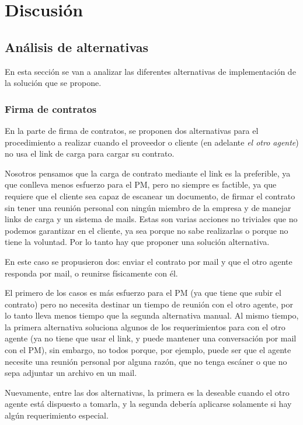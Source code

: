 \section{Discusión}
\subsection{Análisis de alternativas}
En esta sección se van a analizar las diferentes alternativas de implementación de la solución que se propone.

\subsubsection{Firma de contratos}
En la parte de firma de contratos, se proponen dos alternativas para el procedimiento a realizar cuando el proveedor o cliente (en adelante \textit{el otro agente}) no usa el link de carga para cargar su contrato.

Nosotros pensamos que la carga de contrato mediante el link es la preferible, ya que conlleva menos esfuerzo para el PM, pero no siempre es factible, ya que requiere que el cliente sea capaz de escanear un documento, de firmar el contrato sin tener una reunión personal con ningún miembro de la empresa y de manejar links de carga y un sistema de mails.
Estas son varias acciones no triviales que no podemos garantizar en el cliente, ya sea porque no sabe realizarlas o porque no tiene la voluntad.
Por lo tanto hay que proponer una solución alternativa.

En este caso se propusieron dos: enviar el contrato por mail y que el otro agente responda por mail, o reunirse físicamente con él.

El primero de los casos es más esfuerzo para el PM (ya que tiene que subir el contrato) pero no necesita destinar un tiempo de reunión con el otro agente, por lo tanto lleva menos tiempo que la segunda alternativa manual.
Al mismo tiempo, la primera alternativa soluciona algunos de los requerimientos para con el otro agente (ya no tiene que usar el link, y puede mantener una conversación por mail con el PM), sin embargo, no todos porque, por ejemplo, puede ser que el agente necesite una reunión personal por alguna razón, que no tenga escáner o que no sepa adjuntar un archivo en un mail.

Nuevamente, entre las dos alternativas, la primera es la deseable cuando el otro agente está dispuesto a tomarla, y la segunda debería aplicarse solamente si hay algún requerimiento especial.

